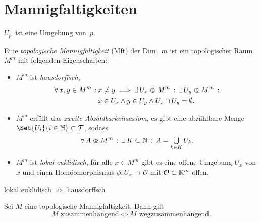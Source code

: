 \documentclass{cheat-sheet}
\newcommand{\Tau}{\mathcal{T}} %
\renewcommand{\O}{\mathcal{O}} %
\begin{document}
\raggedcolumns %


\section{Mannigfaltigkeiten}

\begin{konv}
  $U_p$~ist eine Umgebung von~$p$.
\end{konv}

\begin{defn}
  Eine \emph{topologische Mannigfaltigkeit} (Mft) der Dim.~$m$ ist ein topologischer Raum $M^m$ mit folgenden Eigenschaften:
  \begin{itemize}
    \item $M^m$ ist \emph{hausdorffsch}, \dh{}
    \begin{align*}
      \fa{x, y \in M^m} &x \not= y \implies \ex{U_x \opn M^m} \ex{U_y \opn M^m}\\
      &x \in U_x \wedge y \in U_y \wedge U_x \cap U_y = \emptyset.
    \end{align*}
    \item $M^m$ erfüllt das \emph{zweite Abzählbarkeitsaxiom}, \dh{} es gibt eine abzählbare Menge $\Set{ U_i }{ i \in \N } \subset \Tau$, sodass
    \[ \fa{A \opn M^m} \ex{K \subset \N} A = \bigcup_{k \in K} U_k. \]
    \item $M^m$ ist \emph{lokal euklidisch}, \dh{} für alle $x \in M^m$ gibt es eine offene Umgebung $U_x$ von $x$ und einen Homöomorphismus $\phi : U_x \to \O$ mit $\O \subset \R^m$ offen.
  \end{itemize}
\end{defn}

\begin{bem}
  lokal euklidisch $\not\Rightarrow$ hausdorffsch
\end{bem}

\begin{lem}
  Sei $M$ eine topologische Mannigfaltigkeit. Dann gilt
  \[ \text{$M$ zusammenhängend} \iff \text{$M$ wegzusammenhängend.} \]
\end{lem}
\end{document}
